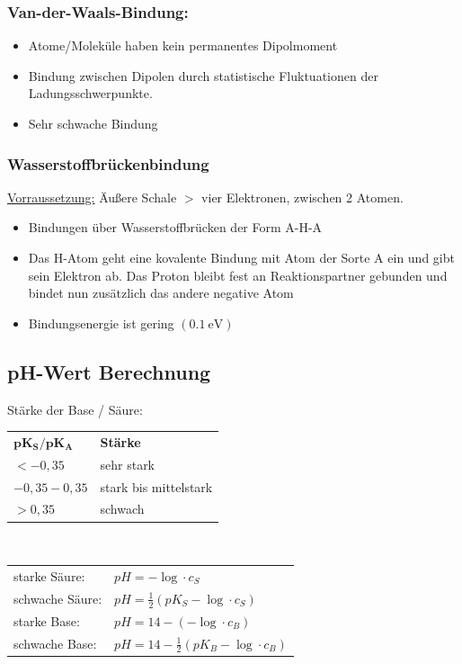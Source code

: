 \documentclass[eglish/german]{latex4ei/latex4ei_sheet}
\begin{document}
\begin{sectionbox}
\subsubsection{Van-der-Waals-Bindung:} 
        \begin{itemize}
        		\item Atome/Moleküle haben kein permanentes Dipolmoment 
				\item Bindung zwischen Dipolen durch statistische Fluktuationen der Ladungsschwerpunkte.
				\item Sehr schwache Bindung
		\end{itemize}
\subsubsection{Wasserstoffbrückenbindung}
	\underline{Vorraussetzung:} Äußere Schale $>$ vier Elektronen, zwischen 2 Atomen.
		\begin{itemize}
				\item Bindungen über Wasserstoffbrücken der Form A-H-A
				\item Das H-Atom geht eine kovalente Bindung mit Atom der Sorte A ein und gibt sein Elektron ab. Das Proton bleibt fest an Reaktionspartner gebunden und bindet nun zusätzlich das andere negative Atom
				\item Bindungsenergie ist gering $(\SI{0,1}{\electronvolt})$    
 		\end{itemize}
	\end{sectionbox}

	\begin{sectionbox}
		\section{pH-Wert Berechnung}
			Stärke der Base / Säure:\\
			\begin{tabular}{ll}
			$\mathbf{pK_S / pK_A}$ & \textbf{Stärke}\\
			$<-0,35$ & sehr stark\\
			$-0,35 - 0,35 $ & stark bis mittelstark\\
			$>0,35$ & schwach\\
			\end{tabular}\\

			\begin{tabular}{ll}
				starke Säure: & $pH = -\log\cdot c_{S}$\\
				schwache Säure: & $pH = \frac{1}{2}(pK_S-\log\cdot c_{S})$\\
				starke Base: & $pH = 14 - (-\log\cdot c_{B})$\\
				schwache Base: & $pH = 14 - \frac{1}{2}(pK_B-\log\cdot c_{B})$\\
			\end{tabular}

	\end{sectionbox}
\newpage
\end{document}
